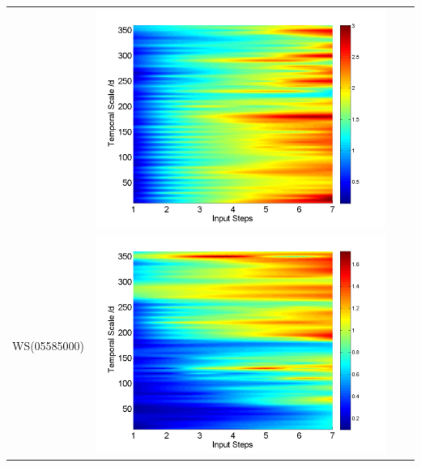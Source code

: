 \documentclass[draft,wrr]{AGUTeX}
\begin{document}
\begin{article}
\begin{table}[H]
\begin{tabular}{cccc}
&\begin{minipage}{.3\textwidth}\includegraphics[width=\linewidth]{resultgraph/02143000pepq.png}\end{minipage}
\\
WS(05585000)
&\begin{minipage}{.3\textwidth}\includegraphics[width=\linewidth]{resultgraph/05585000p.png}\end{minipage}

\end{tabular}
\end{table}
\end{article}
\end{document}
